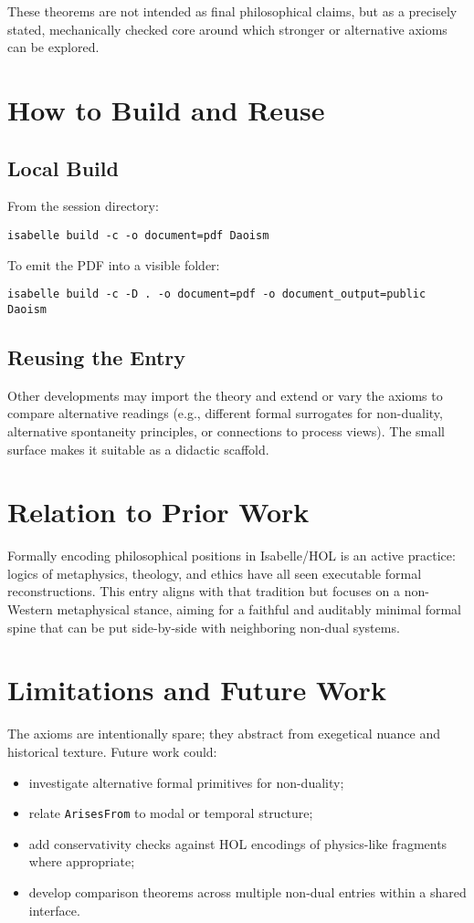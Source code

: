 \documentclass[11pt,a4paper]{article}
\begin{document}
\medskip
These theorems are not intended as final philosophical claims, but as a
precisely stated, mechanically checked core around which stronger or alternative
axioms can be explored.

\section{How to Build and Reuse}

\subsection{Local Build}
From the session directory:
\begin{lstlisting}
isabelle build -c -o document=pdf Daoism
\end{lstlisting}
To emit the PDF into a visible folder:
\begin{lstlisting}
isabelle build -c -D . -o document=pdf -o document_output=public Daoism
\end{lstlisting}

\subsection{Reusing the Entry}
Other developments may import the theory and extend or vary the axioms to
compare alternative readings (e.g., different formal surrogates for
non-duality, alternative spontaneity principles, or connections to process
views). The small surface makes it suitable as a didactic scaffold.

\section{Relation to Prior Work}

Formally encoding philosophical positions in Isabelle/HOL is an active
practice: logics of metaphysics, theology, and ethics have all seen executable
formal reconstructions. This entry aligns with that tradition but focuses on a
non-Western metaphysical stance, aiming for a faithful and auditably minimal
formal spine that can be put side-by-side with neighboring non-dual systems.

\section{Limitations and Future Work}

The axioms are intentionally spare; they abstract from exegetical nuance and
historical texture. Future work could:
\begin{itemize}
  \item investigate alternative formal primitives for non-duality;
  \item relate \texttt{ArisesFrom} to modal or temporal structure;
  \item add conservativity checks against HOL encodings of physics-like
        fragments where appropriate;
  \item develop comparison theorems across multiple non-dual entries within a
        shared interface.
\end{itemize}
\end{document}
